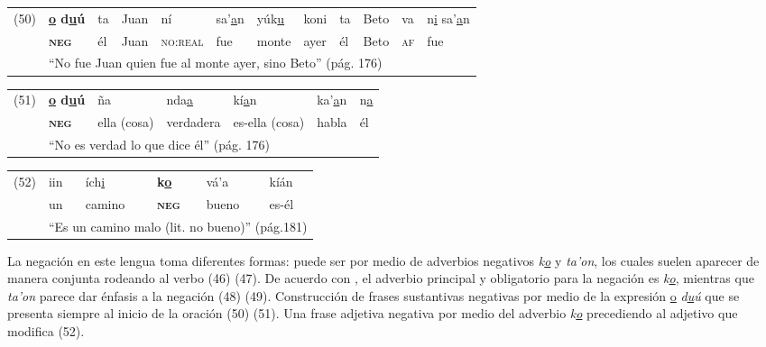 {%
{\small
\noindent \begin{tabular}{llllllllllll}
 (50) & \textbf{\underline{o} d\underline{u}ú} & ta & Juan & ní & sa'\underline{a}n & yúk\underline{u} & koni & ta & Beto & va & n\underline{i} sa'\underline{a}n \\
 & \textsc{\textbf{neg}} & él & Juan & \textsc{no:real} & fue & monte & ayer & él & Beto & \textsc{af} & fue \\
 & \multicolumn{11}{l}{``No fue Juan quien fue al monte ayer, sino Beto'' (pág. 176)}
\end{tabular} \vspace{0.2cm}
}

\noindent \begin{tabular}{lllllll}
(51) & \textbf{\underline{o} d\underline{u}ú} & ña & nda\underline{a} & kí\underline{a}n & ka'\underline{a}n & n\underline{a} \\
& \textsc{\textbf{neg}} & ella (cosa) & verdadera & es-ella (cosa) & habla & él \\
& \multicolumn{6}{l}{``No es verdad lo que dice él'' (pág. 176)}
\end{tabular} \vspace{0.2cm}

\noindent \begin{tabular}{llllll}
(52) & iin & ích\underline{i} & \textbf{k\underline{o}} & vá'a & kíán \\
& un & camino & \textsc{\textbf{neg}} & bueno & es-él \\
& \multicolumn{5}{l}{``Es un camino malo (lit. no bueno)'' (pág.181)}
\end{tabular} \vspace{0.25cm}

}

La negación en este lengua toma diferentes formas: puede ser por medio de adverbios negativos {\setmainfont{Charis SIL} \textit{k\underline{o}} y \textit{ta'on}}, los cuales suelen aparecer de manera conjunta rodeando al verbo (46) (47). De acuerdo con \textcolor{MidnightBlue}{\citet{Mixteco}}, el adverbio principal y obligatorio para la negación es {\setmainfont{Charis SIL} \textit{k\underline{o}}}, mientras que {\setmainfont{Charis SIL} \textit{ta'on}} parece dar énfasis a la negación (48) (49). Construcción de frases sustantivas negativas por medio de la expresión {\setmainfont{Charis SIL} \underline{o} \textit{d\underline{u}ú}} que se presenta siempre al inicio de la oración (50) (51). Una frase adjetiva negativa por medio del adverbio {\setmainfont{Charis SIL} \textit{k\underline{o}}} precediendo al adjetivo que modifica (52).
